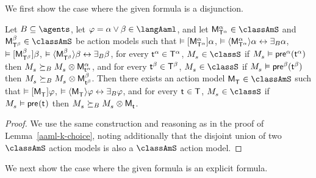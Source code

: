 We first show the case where the given formula is a disjunction.

\begin{lemma}\label{aaml-s5-choice}
Let $\agentsB \subseteq \agents$, 
let $\phi = \alpha \lor \beta \in \langAaml$, and 
let $\aPModel[\alpha]{\aStatesT[\alpha]} \in \classAmS$ and $\aPModel[\beta]{\aStatesT[\beta]} \in \classAmS$ be action models such that 
$\entails \actionA{\aPModel[\alpha]{\aStatesT[\alpha]}} \alpha$, 
$\entails \actionE{\aPModel[\alpha]{\aStatesT[\alpha]}} \alpha \iff \someactsBs \alpha$, 
$\entails \actionA{\aPModel[\beta]{\aStatesT[\beta]}} \beta$,
$\entails \actionE{\aPModel[\beta]{\aStatesT[\beta]}} \beta \iff \someactsBs \beta$,
for every $\aStateT[\alpha] \in \aStatesT[\alpha]$, $\kPModel{\kStateS} \in \classS$ if $\kPModel{\kStateS} \entails \aPrecondition[\alpha](\aStateT[\alpha])$ then $\kPModel{\kStateS} \simulatesBs \kPModel{\kStateS} \exec \aPModel[\alpha]{\aStateT[\alpha]}$, and
for every $\aStateT[\beta] \in \aStatesT[\beta]$, $\kPModel{\kStateS} \in \classS$ if $\kPModel{\kStateS} \entails \aPrecondition[\beta](\aStateT[\beta])$ then $\kPModel{\kStateS} \simulatesBs \kPModel{\kStateS} \exec \aPModel[\beta]{\aStateT[\beta]}$.
Then there exists an action model $\aPModel{\aStatesT} \in \classAmS$ such that 
$\entails \actionA{\aPModel{\aStatesT}} \phi$,
$\entails \actionE{\aPModel{\aStatesT}} \phi \iff \someactsBs \phi$, and
for every $\aStateT \in \aStatesT$, $\kPModel{\kStateS} \in \classS$ if $\kPModel{\kStateS} \entails \aPrecondition(\aStateT)$ then $\kPModel{\kStateS} \simulatesBs \kPModel{\kStateS} \exec \aPModel{\aStateT}$.
\end{lemma}

\begin{proof}[Proof]
We use the same construction and reasoning as in the proof of Lemma~\ref{aaml-k-choice}, noting additionally that the disjoint union of two $\classAmS$ action models is also a $\classAmS$ action model.
\end{proof}

We next show the case where the given formula is an explicit formula.


